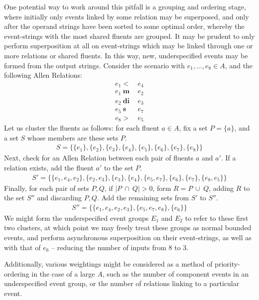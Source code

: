 \documentclass[a4paper,11pt,leqno]{article}
\begin{document}
One potential way to work around this pitfall is a grouping and ordering stage, 
where initially only events linked by some relation may be superposed, and only 
after the operand strings have been sorted to some optimal order, whereby the 
event-strings with the most shared fluents are grouped. It may be 
prudent to only perform superposition at all on event-strings which may be 
linked through one or more relations or shared fluents. In this way, new, 
underspecified events may be formed from the output strings. Consider the 
scenario with $e_1, \ldots, e_8 \in A$, and the following Allen 
Relations:
\begin{align*}
e_1 <& ~e_4\\
e_1 ~\mathbf{m}& ~e_2\\
e_2 ~\mathbf{di}& ~e_3\\
e_5 ~\mathbf{s}& ~e_7\\
e_8 >& ~e_5
\end{align*} 
Let us cluster the fluents as follows: for each fluent $a \in A$, fix a set $P 
= \{ a \}$, and a set $S$ whose members are these sets $P$.
\begin{align}
S = \{\{e_1\},\{e_2\},\{e_3\},\{e_4\},\{e_5\},\{e_6\},\{e_7\},\{e_8\}\}
\end{align}
Next, check for an Allen Relation between each pair of fluents $a$ and $a'$. If 
a relation exists, add the fluent $a'$ to the set $P$.
\begin{align}
S' = \{\{e_1, e_4, e_2\},\{e_2, e_3\}, \{e_3\}, \{e_4\}, \{e_5, e_7\}, \{e_6\}, 
\{e_7\}, \{e_8, e_5\}\}
\end{align}
Finally, for each pair of sets $P, Q$, if $|P ~\cap~ Q| > 0$, form $R = P 
~\cup~Q$, adding $R$ to the set $S''$ and discarding $P, Q$. Add the remaining 
sets 
from $S'$ to $S''$.
\begin{align}
S'' = \{\{e_1, e_4, e_2, e_3\}, \{e_5, e_7, e_8\}, \{e_6\}\}
\end{align}
We might form the underspecified event groups $E_1$ and 
$E_2$ to refer to these first two clusters, at which point we may freely treat 
these groups as normal bounded events, and perform asynchronous superposition 
on their event-strings, as well as with that of $e_6$ -- reducing the 
number of inputs from 8 to 3.

Additionally, various weightings might be considered as a method of 
priority-ordering in the case of a large $A$, such as the number of 
component events in an underspecified event group, or the number of relations 
linking to a particular event.
\end{document}
